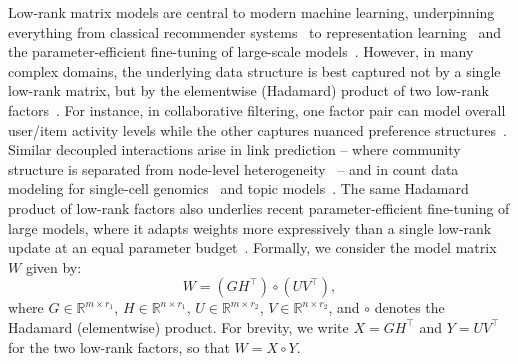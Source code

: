 \documentclass[letterpaper, 10 pt, conference]{ieeeconf}
\newcommand{\R}{\mathbb{R}}
\newcommand{\Had}{\circ}
\theoremstyle{plain}
\theoremstyle{definition}
\theoremstyle{remark}
\newcommand{\BMorig}[1]{{#1}}%
\begin{document}
Low-rank matrix models are central to modern machine learning, underpinning everything from classical recommender systems~\cite{koren2009matrix} to representation learning~\cite{mikolov2013distributed} and the parameter-efficient fine-tuning of large-scale models~\cite{hu2022lora}.
However, in many complex domains, the underlying data structure is best captured not by a single low-rank matrix, but by the elementwise (Hadamard) product of two low-rank factors~\cite{ciaperoni2024hadamard}. For instance, in collaborative filtering, one factor pair can model overall user/item activity levels while the other captures nuanced preference structures~\cite{koren2009matrix}. Similar decoupled interactions arise in link prediction -- where community structure is separated from node-level heterogeneity~\cite{hoff2002latent} -- and in count data modeling for single-cell genomics~\cite{townes2019glmpca} and topic models~\cite{lee1999nmf}. The same Hadamard product of low-rank factors also underlies recent parameter-efficient fine-tuning of large models, where it adapts weights more expressively than a single low-rank update at an equal parameter budget~\cite{singhal2025abba,yu2025boha}.
Formally, we consider the model matrix $W$ given by:
\begin{equation}\label{eq:hadamard_form}
  W = (GH^\top) \Had (UV^\top),
\end{equation}
where $G\in\R^{m\times r_1}$, $H\in\R^{n\times r_1}$, $U\in\R^{m\times r_2}$, $V\in\R^{n\times r_2}$, and $\Had$ denotes the Hadamard (elementwise) product.
\BMorig{For brevity, we write $X = GH^\top$ and $Y = UV^\top$ for the two low-rank factors, so that $W = X\Had Y$.}

\end{document}
